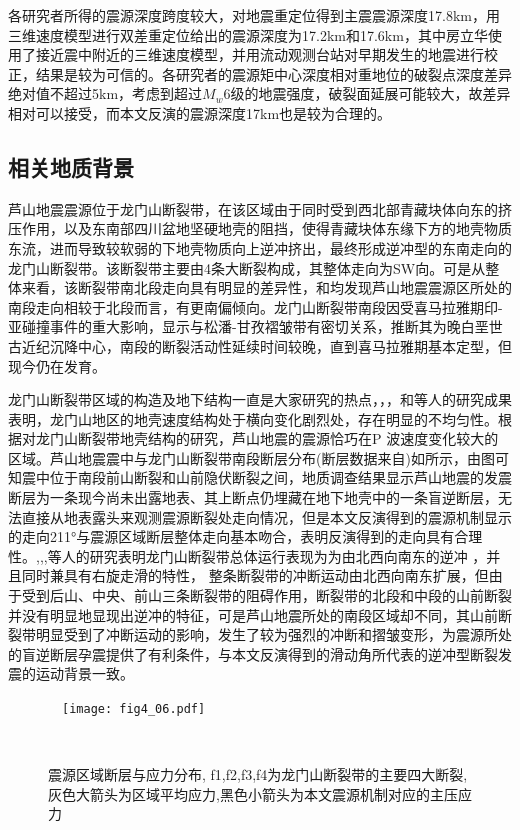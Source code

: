 各研究者所得的震源深度跨度较大，对地震重定位得到主震震源深度17.8km，用三维速度模型进行双差重定位给出的震源深度为17.2km和17.6km，其中房立华使用了接近震中附近的三维速度模型，并用流动观测台站对早期发生的地震进行校正，结果是较为可信的。各研究者的震源矩中心深度相对重地位的破裂点深度差异绝对值不超过5km，考虑到超过$M_w$6级的地震强度，破裂面延展可能较大，故差异相对可以接受，而本文反演的震源深度17km也是较为合理的。

\subsection{相关地质背景}
芦山地震震源位于龙门山断裂带，在该区域由于同时受到西北部青藏块体向东的挤压作用，以及东南部四川盆地坚硬地壳的阻挡，使得青藏块体东缘下方的地壳物质东流，进而导致较软弱的下地壳物质向上逆冲挤出，最终形成逆冲型的东南走向的龙门山断裂带\citep{Zhang2013}。该断裂带主要由4条大断裂构成，其整体走向为SW向。可是从整体来看，该断裂带南北段走向具有明显的差异性\citep{Jia2006,Arne1997}，和均发现芦山地震震源区所处的南段走向相较于北段而言，有更南偏倾向。龙门山断裂带南段因受喜马拉雅期印-亚碰撞事件的重大影响，显示与松潘-甘孜褶皱带有密切关系，推断其为晚白垩世古近纪沉降中心，南段的断裂活动性延续时间较晚，直到喜马拉雅期基本定型，但现今仍在发育。

龙门山断裂带区域的构造及地下结构一直是大家研究的热点，\citet{Zhang2013}，\citet{Wang2010}，和\citet{Zhang2011}等人的研究成果表明，龙门山地区的地壳速度结构处于横向变化剧烈处，存在明显的不均匀性。根据对龙门山断裂带地壳结构的研究，芦山地震的震源恰巧在P 波速度变化较大的区域。芦山地震震中与龙门山断裂带南段断层分布(断层数据来自)如所示，由图可知震中位于南段前山断裂和山前隐伏断裂之间，地质调查结果显示芦山地震的发震断层为一条现今尚未出露地表、其上断点仍埋藏在地下地壳中的一条盲逆断层，无法直接从地表露头来观测震源断裂处走向情况，但是本文反演得到的震源机制显示的走向211°与震源区域断层整体走向基本吻合，表明反演得到的走向具有合理性。,,\citet{Densmore2007},等人的研究表明龙门山断裂带总体运行表现为为由北西向南东的逆冲 ，并且同时兼具有右旋走滑的特性， 整条断裂带的冲断运动由北西向南东扩展，但由于受到后山、中央、前山三条断裂带的阻碍作用，断裂带的北段和中段的山前断裂并没有明显地显现出逆冲的特征，可是芦山地震所处的南段区域却不同，其山前断裂带明显受到了冲断运动的影响，发生了较为强烈的冲断和摺皱变形，为震源所处的盲逆断层孕震提供了有利条件，与本文反演得到的滑动角所代表的逆冲型断裂发震的运动背景一致。
\begin{figure}
\centering
  \texttt{[image: fig4\_06.pdf]}
  \caption{ 震源区域断层与应力分布, f1,f2,f3,f4为龙门山断裂带的主要四大断裂,灰色大箭头为区域平均应力,黑色小箭头为本文震源机制对应的主压应力}
  \label{fig4_06}
\end{figure}

